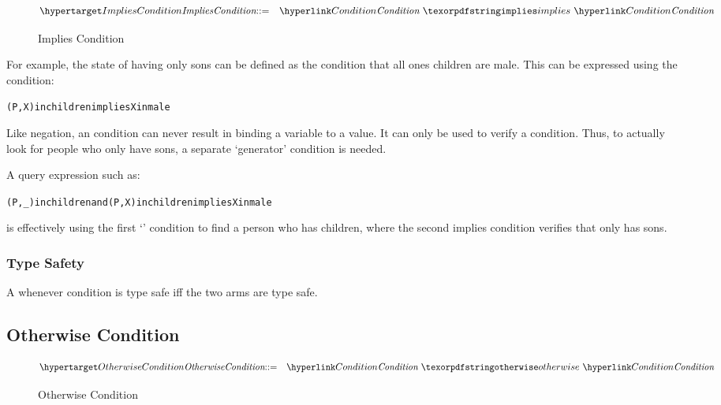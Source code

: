 \begin{figure}[htbp]
\begin{eqnarray*}
\ntDef{ImpliesCondition}&\arrow&\ntRef{Condition}\ \q{implies}\ \ntRef{Condition}
\end{eqnarray*}
\caption{Implies Condition}
\label{impliesConditionFormFig}
\end{figure}

For example, the state of having only sons can be defined as the condition that all ones children are male. This can be expressed using the condition:
\begin{alltt}
(P,X) in children implies X in male 
\end{alltt}

\begin{aside}
Like negation, an  condition can never result in binding a variable to a value. It can only be used to verify a condition. Thus, to actually look for people who only have sons, a separate `generator' condition is needed. 

A query expression such as:
\begin{alltt}
(P,_) in children and (P,X) in children implies X in male
\end{alltt}
is effectively using the first `' condition to find a person who has children, where the second implies condition verifies that only has sons.
\end{aside}

\subsubsection{Type Safety}
A whenever condition is type safe iff the two arms are type safe.
\begin{prooftree}
\end{prooftree}


\subsection{Otherwise Condition}
\label{otherwiseQuery}

\begin{figure}[htbp]
\begin{eqnarray*}
\ntDef{OtherwiseCondition}&\arrow&\ntRef{Condition}\ \q{otherwise}\ \ntRef{Condition}
\end{eqnarray*}
\caption{Otherwise Condition}
\label{otherwiseConditionFormFig}
\end{figure}

